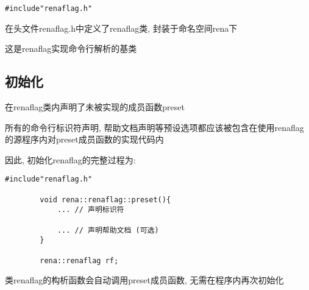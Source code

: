 \documentclass[12pt , a4paper , oneside]{ctexart}
\begin{document}
        \begin{lstlisting}[numbers=none]
        #include"renaflag.h"
        \end{lstlisting}

        在头文件\textcolor{file}{renaflag.h}中定义了\textcolor{program}{renaflag}类, 封装于命名空间\textcolor{program}{rena}下

        这是renaflag实现命令行解析的基类

        \subsection{初始化}

            在\textcolor{program}{renaflag}类内声明了未被实现的成员函数\textcolor{program}{preset}

            所有的命令行标识符声明, 帮助文档声明等预设选项都应该被包含在使用renaflag的源程序内对\textcolor{program}{preset}成员函数的实现代码内

            因此, 初始化renaflag的完整过程为:

            \begin{lstlisting}[numbers=none]
        #include"renaflag.h"

        void rena::renaflag::preset(){
            ... // 声明标识符

            ... // 声明帮助文档 (可选)
        }

        rena::renaflag rf;
            \end{lstlisting}

            类\textcolor{program}{renaflag}的构析函数会自动调用\textcolor{program}{preset}成员函数, 无需在程序内再次初始化
\end{document}
